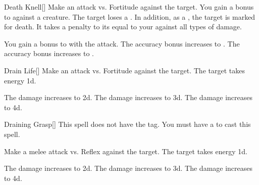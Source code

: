 \lowercase{\hypertarget{spell:Death Knell}{}}\label{spell:Death Knell}
\begin{freeability}[Rank 1]{\hypertarget{spell:Death Knell}{Death Knell}}[]
Make an attack vs. Fortitude against the target.
You gain a  bonus to  against a  creature.
\hit The target loses a .
In addition, as a , the target is marked for death.
It takes a penalty to its  equal to your  against all types of damage.

\rankline
{} You gain a  bonus to  with the attack.
 The accuracy bonus increases to .
 The accuracy bonus increases to .
\end{freeability}
\vspace{0.25em}



\lowercase{\hypertarget{spell:Drain Life}{}}\label{spell:Drain Life}
\begin{freeability}[Rank 1]{\hypertarget{spell:Drain Life}{Drain Life}}[]
Make an attack vs. Fortitude against the target.
\hit The target takes energy  \plus1d.

\rankline
{} The damage increases to  \plus2d.
 The damage increases to  \plus3d.
 The damage increases to  \plus4d.
\end{freeability}
\vspace{0.25em}



\lowercase{\hypertarget{spell:Draining Grasp}{}}\label{spell:Draining Grasp}
\begin{freeability}[Rank 1]{\hypertarget{spell:Draining Grasp}{Draining Grasp}}[]
This spell does not have the  tag.
You must have a  to cast this spell.

Make a melee attack vs. Reflex against the target.
\hit The target takes energy  \plus1d.

\rankline
{} The damage increases to  \plus2d.
 The damage increases to  \plus3d.
 The damage increases to  \plus4d.
\end{freeability}
\vspace{0.25em}



